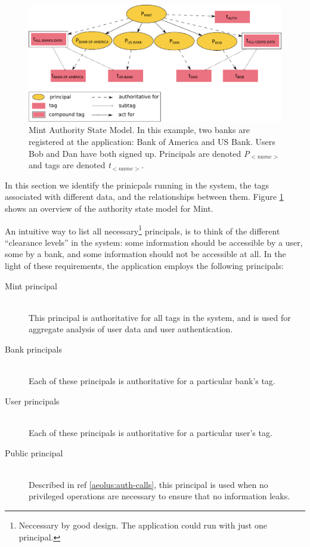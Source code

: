 \begin{figure}[h]
\centering
\includegraphics[width=\textwidth,height=\textheight,keepaspectratio]{figures/mint-auth-state-model}
\caption{Mint Authority State Model. In this example, two banks are registered at the application: Bank of America and US Bank. Users Bob and Dan have both signed up. Principals are denoted \emph{P$_{<name>}$} and tags are denoted \emph{t$_{<name>}$}.}
\label{fig:mint-auth-state-model}
\end{figure}


In this section we identify the prinicpals running in the system, the tags associated with different data, and the relationships between them. Figure \ref{fig:mint-auth-state-model} shows an overview of the authority state model for Mint.

An intuitive way to list all necessary\footnote{Neccessary by good design. The application could run with just one principal.} principals, is to think of the different ``clearance levels'' in the system: some information should be accessible by a user, some by a bank, and some information should not be accessible at all. In the light of these requirements, the application employs the following principals:
\begin{description}
  \item[Mint principal] \ \\
    This principal is authoritative for all tags in the system, and is
    used for aggregate analysis of user data and
    user authentication.
  \item[Bank principals] \ \\
    Each of these principals is authoritative for a particular bank's tag.
  \item[User principals] \ \\
    Each of these principals is authoritative for a particular user's tag.
  \item[Public principal] \ \\
    Described in ref \ref{aeolus:auth-calls}, this
    principal is used when no privileged operations are 
    necessary to ensure that no information leaks.
\end{description}


